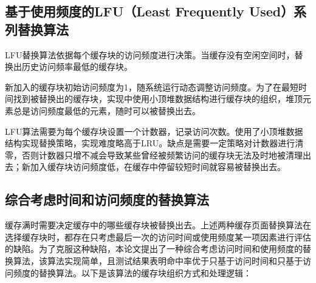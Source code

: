 \subsection{基于使用频度的LFU（Least Frequently Used）系列替换算法}

LFU替换算法\cite{LFU}依据每个缓存块的访问频度进行决策。当缓存没有空闲空间时，替换出历史访问频率最低的缓存块。

新加入的缓存块初始访问频度为1，随系统运行动态调整访问频度。为了在最短时间找到被替换出的缓存块，实现中使用小顶堆数据结构进行缓存块的组织，堆顶元素总是访问频度最低的元素，随时可以被替换出去。

LFU算法需要为每个缓存块设置一个计数器，记录访问次数。使用了小顶堆数据结构实现替换策略，实现难度略高于LRU。缺点是需要一定策略对计数器进行清零，否则计数器只增不减会导致某些曾经被频繁访问的缓存块无法及时地被清理出去；新加入缓存块访问频度低，在缓存中停留较短时间就容易被替换出去。

\subsection{综合考虑时间和访问频度的替换算法}

缓存满时需要决定缓存中的哪些缓存块被替换出去。上述两种缓存页面替换算法在选择缓存块时，都存在只考虑最后一次的访问时间或使用频度某一项因素进行评估的缺陷。为了克服这种缺陷，本论文提出了一种综合考虑访问时间和使用频度的替换算法，该算法实现简单，且测试结果表明命中率优于只基于访问时间和只基于访问频度的替换算法。以下是该算法的缓存块组织方式和处理逻辑：

